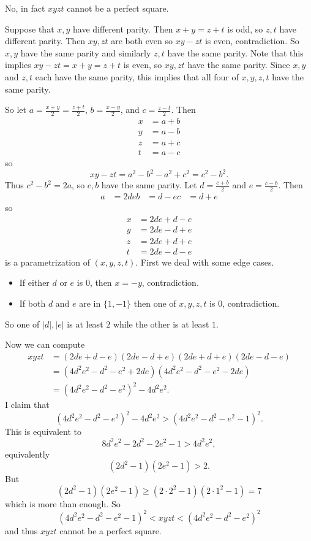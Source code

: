 No, in fact $xyzt$ cannot be a perfect square.

Suppose that $x,y$ have different parity. Then $x+y=z+t$ is odd, so $z,t$ have different parity. Then $xy,zt$ are both even so $xy-zt$ is even, contradiction. So $x,y$ have the same parity and similarly $z,t$ have the same parity. Note that this implies $xy-zt=x+y=z+t$ is even, so $xy,zt$ have the same parity. Since $x,y$ and $z,t$ each have the same parity, this implies that all four of $x,y,z,t$ have the same parity.

So let $a=\frac{x+y}{2}=\frac{z+t}{2}$, $b=\frac{x-y}{2}$, and $c=\frac{z-t}{2}$. Then
\begin{align*}
	x&=a+b\\
	y&=a-b\\
	z&=a+c\\
	t&=a-c
\end{align*}
so \[xy-zt=a^2-b^2-a^2+c^2=c^2-b^2.\] Thus $c^2-b^2=2a$, so $c,b$ have the same parity. Let $d=\frac{c+b}{2}$ and $e=\frac{c-b}{2}$. Then
\begin{align*}
	a&=2de
	b&=d-e
	c&=d+e
\end{align*}
so
\begin{align*}
	x&=2de+d-e\\
	y&=2de-d+e\\
	z&=2de+d+e\\
	t&=2de-d-e
\end{align*}
is a parametrization of $(x,y,z,t)$. First we deal with some edge cases.
\begin{itemize}
	\item If either $d$ or $e$ is $0$, then $x=-y$, contradiction.
	\item If both $d$ and $e$ are in $\{1,-1\}$ then one of $x,y,z,t$ is $0$, contradiction.
\end{itemize}
So one of $|d|,|e|$ is at least $2$ while the other is at least $1$.

Now we can compute
\begin{align*}
	xyzt&=(2de+d-e)(2de-d+e)(2de+d+e)(2de-d-e)\\
	&=(4d^2e^2-d^2-e^2+2de)(4d^2e^2-d^2-e^2-2de)\\
	&=(4d^2e^2-d^2-e^2)^2-4d^2e^2.
\end{align*}
I claim that \[(4d^2e^2-d^2-e^2)^2-4d^2e^2>(4d^2e^2-d^2-e^2-1)^2.\] This is equivalent to \[8d^2e^2-2d^2-2e^2-1>4d^2e^2,\] equivalently \[(2d^2-1)(2e^2-1)>2.\] But \[(2d^2-1)(2e^2-1)\geq(2\cdot2^2-1)(2\cdot1^2-1)=7\] which is more than enough. So \[(4d^2e^2-d^2-e^2-1)^2<xyzt<(4d^2e^2-d^2-e^2)^2\] and thus $xyzt$ cannot be a perfect square.